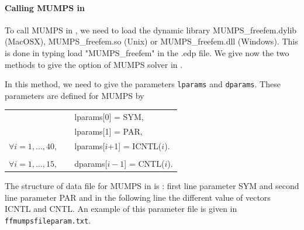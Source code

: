 \documentclass[a4paper,twoside,12pt]{book}
\begin{document}
\begin{paragraph}

\end{paragraph}

\paragraph{Calling MUMPS in \freefempp}

To call MUMPS in \freefempp, we need to load the dynamic library MUMPS\_freefem.dylib (MacOSX),  MUMPS\_freefem.so (Unix) or  MUMPS\_freefem.dll (Windows).
This is  done in typing load "MUMPS\_freefem" in the .edp file. We give now the two methods to give the option of MUMPS solver in \freefempp.

\vspace*{0.5cm}

In this method,  we need to give the parameters \texttt{lparams} and \texttt{dparams}. These parameters are defined for MUMPS by \\
\begin{center}
\begin{tabular}{ll}
&lparams[0] = SYM, \\
&lparams[1] = PAR,  \\
$\forall i=1,\ldots,40, \quad$ & lparams[$i$+1] = ICNTL($i$).\\
\\
$\forall i=1,\ldots,15, \quad$ & dparams[$i-1$] = CNTL($i$).
\end{tabular}
\end{center}

\vspace*{0.5cm}

The structure of data file for MUMPS in \freefempp is : first line parameter SYM and second line parameter PAR and in the following line the different value of vectors ICNTL and CNTL. An example of this parameter file is given in \texttt{ffmumpsfileparam.txt}. \\
\end{document}
